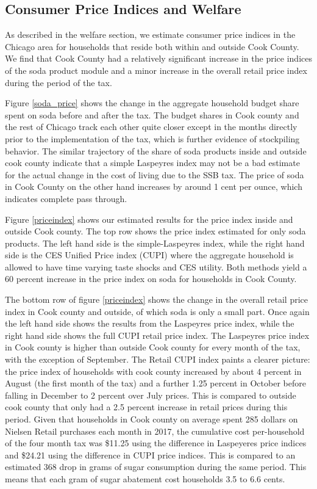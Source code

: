 \documentclass[12pt]{article}
\begin{document}
\subsection{Consumer Price Indices and Welfare}

As described in the welfare section, we estimate consumer price indices in the Chicago area for households that reside both within and outside Cook County. We find that Cook County had a relatively significant increase in the price indices of the soda product module and a minor increase in the overall retail price index during the period of the tax.

Figure \ref{soda_price} shows the change in the aggregate household budget  share spent on soda before and after the tax. The budget shares in Cook county and the rest of Chicago track each other quite closer except in the months directly prior to the implementation of the tax, which is further evidence of stockpiling behavior. The similar trajectory of the share of soda products inside and outside cook county indicate that a simple Laspeyres index may not be a bad estimate for the actual change in the cost of living due to the SSB tax. The price of soda in Cook County  on the other hand increases by around 1 cent per ounce, which indicates complete pass through.

Figure \ref{priceindex} shows our estimated results for the price index inside and outside Cook county. The top row shows the price index estimated for only soda products. The left hand side is the simple-Laspeyres index, while the right hand side is the CES Unified Price index (CUPI) where the aggregate household is allowed to have time varying taste shocks and CES utility. Both methods yield a 60 percent increase in the price index on soda for households in Cook County.

The bottom row of figure \ref{priceindex} shows the change in the overall retail price index in Cook county and outside, of which soda is only a small part. Once again the left hand side shows the results from the Laspeyres price index, while the right hand side shows the full CUPI retail price index. The Laspeyres price index in Cook county is higher than outside Cook county for every month of the tax, with the exception of September. The Retail CUPI index paints a clearer picture: the price index of households with cook county increased by about 4 percent in August (the first month of the tax) and a further 1.25 percent in October before falling in December to 2 percent over July prices. This is compared to outside cook county that only had a 2.5 percent increase in retail prices during this period. Given that households in Cook county on average spent 285 dollars on Nielsen Retail purchases each month in 2017, the cumulative cost per-household of the four month tax was \$11.25 using the difference in Laspeyeres price indices and \$24.21 using the difference in CUPI price indices. This is compared to an estimated 368 drop in grams of sugar consumption during the same period. This means that each gram of sugar abatement cost households 3.5 to 6.6 cents.
\end{document}
